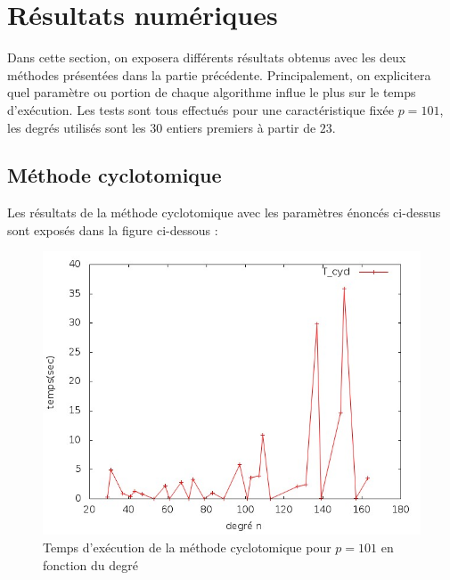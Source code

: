 \documentclass[a4paper]{article} %
\numberwithin{section}{part}
\numberwithin{equation}{section}
\begin{document}
\section{Résultats numériques}
\label{sec:resnum}
%
%
%
%
Dans cette section, on exposera différents résultats obtenus avec les deux
méthodes présentées dans la partie précédente. Principalement, on explicitera
quel paramètre ou portion de chaque algorithme influe le plus sur le temps
d'exécution. Les tests sont tous effectués pour une caractéristique fixée $p = 
101$, les degrés utilisés sont les $30$ entiers premiers à partir de $23$.

\subsection{Méthode cyclotomique}
Les résultats de la méthode cyclotomique avec les paramètres énoncés ci-dessus
 sont exposés dans la figure ci-dessous :
\begin{figure}[H]
\begin{center}
\includegraphics[scale=0.7]{data_test15_testcycl1}
\caption{Temps d'exécution de la méthode cyclotomique pour $p = 101$ en fonction
du degré}
\label{fig:tempscyclo}
\end{center}
\end{figure}
\end{document}
